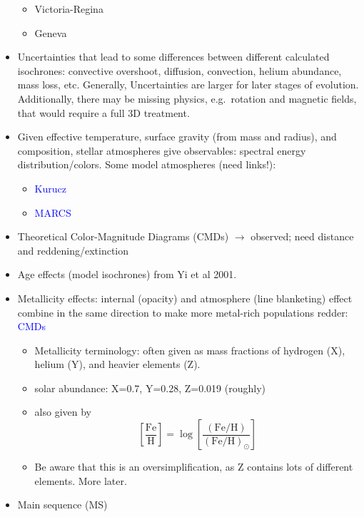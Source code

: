 \documentclass{article}
\begin{document}
\begin{itemize}
\begin{itemize}
          \item Victoria-Regina
          \item Geneva
      \end{itemize}
    \item Uncertainties that lead to some differences between different
        calculated isochrones: convective overshoot, diffusion, convection,
        helium abundance, mass loss, etc. Generally, Uncertainties are larger
        for later stages of evolution. Additionally, there may be missing
        physics, e.g.\ rotation and magnetic fields, that would require a full
        3D treatment.
    \item Given effective temperature,
        surface gravity (from mass and radius), and composition,
        stellar atmospheres give observables: spectral energy
        distribution/colors. Some model atmospheres (need links!):
        \begin{itemize}
            \item \textcolor{blue}{Kurucz}
            \item \textcolor{blue}{MARCS}
        \end{itemize}
    \item Theoretical Color-Magnitude Diagrams (CMDs) $\rightarrow$
      observed; need distance and reddening/extinction
    \item Age effects (model isochrones) from Yi et al 2001.
    \item Metallicity effects: internal (opacity) and atmosphere
      (line blanketing) effect combine in the same direction to make
      more metal-rich populations redder: \textcolor{blue}{CMDs}
      \begin{itemize}
          \item Metallicity terminology: often given as mass fractions of
              hydrogen (X), helium (Y), and heavier elements (Z).
          \item solar abundance: X=0.7, Y=0.28, Z=0.019 (roughly)
          \item also given by
              $$ \left[\frac{\textrm{Fe}}{\textrm{H}}\right] =
              \log\left[
              \frac{\left( {\textrm{Fe}}/{\textrm{H}} \right)}
              {\left({\textrm{Fe}}/{\textrm{H}}\right)_{\odot}}
              \right]$$
          \item Be aware that this is an oversimplification, as Z contains
              lots of different elements. More later.
      \end{itemize}
    \item Main sequence (MS)

\end{itemize}
\end{document}
